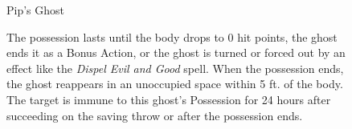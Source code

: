 \begin{figure}[b!]
\begin{monsterbox}{Pip’s Ghost}
\begin{multicols}{2}
\begin{monsteraction}
    \par The possession lasts until the body drops to 0 hit points, the ghost ends it as a Bonus Action, or the ghost is turned or forced out by an effect like the \textit{Dispel Evil and Good} spell. When the possession ends, the ghost reappears in an unoccupied space within 5 ft. of the body. The target is immune to this ghost's Possession for 24 hours after succeeding on the saving throw or after the possession ends.
  \end{monsteraction}
  \end{multicols}
\end{monsterbox}


\end{figure}

\twocolumn
